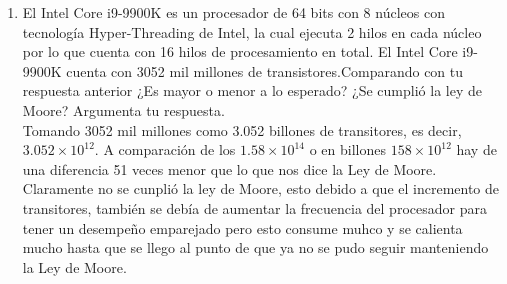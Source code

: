 \documentclass[a4paper,12pt]{article}
\begin{document}
\begin{enumerate}[label=\textcolor{teal}{\textbf{\arabic*.}}]
    \item El Intel Core i9-9900K es un procesador de 64 bits con 8 núcleos con tecnología Hyper-Threading de Intel, la cual ejecuta 2 hilos en cada núcleo por lo que cuenta con 16 hilos de procesamiento en total. El Intel Core i9-9900K cuenta con 3052 mil millones de transistores.Comparando con tu respuesta anterior ¿Es mayor o menor a lo esperado? ¿Se cumplió la ley de Moore? Argumenta tu respuesta.\\
    Tomando 3052 mil millones como 3.052 billones de transitores, es decir, $3.052\times10^{12}$. A comparación de los $1.58\times 10^{14}$ o en billones $158\times 10^{12}$ hay de una diferencia 51 veces menor que lo que nos dice la Ley de Moore.\\
    Claramente no se cunplió la ley de Moore, esto debido a que el incremento de transitores, también se debía de aumentar la frecuencia del procesador para tener un desempeño emparejado pero esto consume muhco y se calienta mucho hasta que se llego al punto de que ya no se pudo seguir manteniendo la Ley de Moore.

            
    
\end{enumerate}


\nocite{*}
\printbibliography
\end{document}
